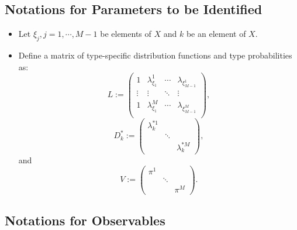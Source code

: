 \documentclass[
]{book}
\providecommand{\tightlist}{%
  \setlength{\itemsep}{0pt}\setlength{\parskip}{0pt}}
\begin{document}
\hypertarget{notations-for-parameters-to-be-identified}{%
\subsection{Notations for Parameters to be Identified}\label{notations-for-parameters-to-be-identified}}

\begin{itemize}
\tightlist
\item
  Let \(\xi_j, j = 1, \cdots, M - 1\) be elements of \(X\) and \(k\) be an element of \(X\).
\item
  Define a matrix of type-specific distribution functions and type probabilities as:
  \[
  L := 
  \begin{pmatrix}
  1 & \lambda_{\xi_1}^1 & \cdots & \lambda_{\xi_{M - 1}^1}\\
  \vdots & \vdots & \ddots & \vdots \\
  1 & \lambda_{\xi_1}^M & \cdots & \lambda_{\xi_{M - 1}^M}\\
  \end{pmatrix},
  \]
  \[
  D_k^* :=
  \begin{pmatrix}
  \lambda_k^{*1} & & \\
  & \ddots & \\
  & & \lambda_k^{*M}
  \end{pmatrix},
  \]
  and
  \[
  V :=
  \begin{pmatrix}
  \pi^1 & & \\
  & \ddots & \\
  & & \pi^M
  \end{pmatrix}.
  \]
\end{itemize}

\hypertarget{notations-for-observables}{%
\subsection{Notations for Observables}\label{notations-for-observables}}
\end{document}
